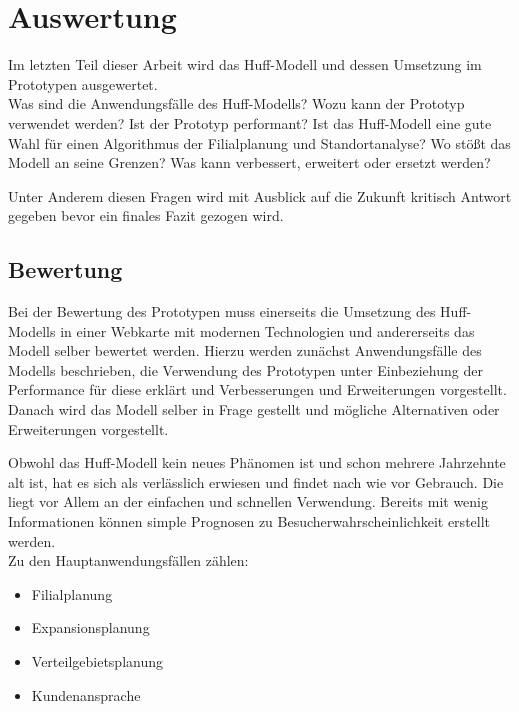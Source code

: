 \chapter{Auswertung}
Im letzten Teil dieser Arbeit wird das Huff-Modell und dessen Umsetzung im Prototypen ausgewertet.\\
Was sind die Anwendungsfälle des Huff-Modells?
Wozu kann der Prototyp verwendet werden?
Ist der Prototyp performant?
Ist das Huff-Modell eine gute Wahl für einen Algorithmus der Filialplanung und Standortanalyse?
Wo stößt das Modell an seine Grenzen?
Was kann verbessert, erweitert oder ersetzt werden?

Unter Anderem diesen Fragen wird mit Ausblick auf die Zukunft kritisch Antwort gegeben bevor ein finales Fazit gezogen wird.

\section{Bewertung}
Bei der Bewertung des Prototypen muss einerseits die Umsetzung des Huff-Modells in einer Webkarte mit modernen Technologien und andererseits das Modell selber bewertet werden.
Hierzu werden zunächst Anwendungsfälle des Modells beschrieben, die Verwendung des Prototypen unter Einbeziehung der Performance für diese erklärt und Verbesserungen und Erweiterungen vorgestellt.
Danach wird das Modell selber in Frage gestellt und mögliche Alternativen oder Erweiterungen vorgestellt.

Obwohl das Huff-Modell kein neues Phänomen ist und schon mehrere Jahrzehnte alt ist, hat es sich als verlässlich erwiesen und findet nach wie vor Gebrauch.
Die liegt vor Allem an der einfachen und schnellen Verwendung. 
Bereits mit wenig Informationen können simple Prognosen zu Besucherwahrscheinlichkeit erstellt werden.\\
Zu den Hauptanwendungsfällen zählen:

\begin{itemize}
	\item Filialplanung
	\item Expansionsplanung
	\item Verteilgebietsplanung
	\item Kundenansprache
\end{itemize}

